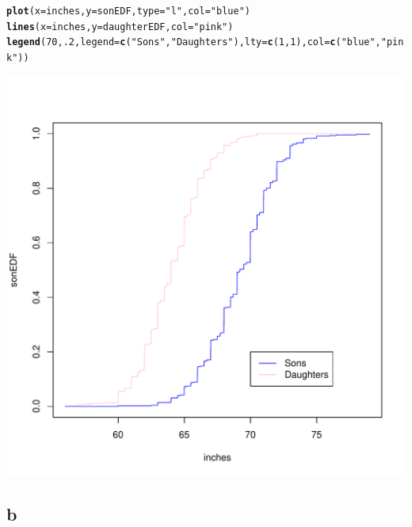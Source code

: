 \documentclass[10pt]{paper}\usepackage[]{graphicx}\usepackage[]{color}
\makeatletter
\def\maxwidth{ %
  \ifdim\Gin@nat@width>\linewidth
    \linewidth
  \else
    \Gin@nat@width
  \fi
}
\newcommand{\hlnum}[1]{\textcolor[rgb]{0.686,0.059,0.569}{#1}}%
\newcommand{\hlstr}[1]{\textcolor[rgb]{0.192,0.494,0.8}{#1}}%
\newcommand{\hlstd}[1]{\textcolor[rgb]{0.345,0.345,0.345}{#1}}%
\newcommand{\hlkwc}[1]{\textcolor[rgb]{0.333,0.667,0.333}{#1}}%
\newcommand{\hlkwd}[1]{\textcolor[rgb]{0.737,0.353,0.396}{\textbf{#1}}}%
\newenvironment{kframe}{%
 \def\at@end@of@kframe{}%
 \ifinner\ifhmode%
  \def\at@end@of@kframe{\end{minipage}}%
  \begin{minipage}{\columnwidth}%
 \fi\fi%
 \def\FrameCommand##1{\hskip\@totalleftmargin \hskip-\fboxsep
 \colorbox{shadecolor}{##1}\hskip-\fboxsep
     \hskip-\linewidth \hskip-\@totalleftmargin \hskip\columnwidth}%
 \MakeFramed {\advance\hsize-\width
   \@totalleftmargin\z@ \linewidth\hsize
   \@setminipage}}%
 {\par\unskip\endMakeFramed%
 \at@end@of@kframe}
\newenvironment{knitrout}{}{} %
\makeatother
\begin{document}
\begin{knitrout}
\begin{kframe}
\begin{alltt}
\hlkwd{plot}\hlstd{(} \hlkwc{x}\hlstd{=inches,} \hlkwc{y}\hlstd{=sonEDF,} \hlkwc{type}\hlstd{=}\hlstr{"l"}\hlstd{,} \hlkwc{col}\hlstd{=}\hlstr{"blue"} \hlstd{)}
\hlkwd{lines}\hlstd{(} \hlkwc{x}\hlstd{=inches,}\hlkwc{y}\hlstd{=daughterEDF,} \hlkwc{col}\hlstd{=}\hlstr{"pink"}\hlstd{)}
\hlkwd{legend}\hlstd{(} \hlnum{70}\hlstd{,}\hlnum{.2}\hlstd{,} \hlkwc{legend}\hlstd{=}\hlkwd{c}\hlstd{(}\hlstr{"Sons"}\hlstd{,}\hlstr{"Daughters"}\hlstd{),} \hlkwc{lty} \hlstd{=} \hlkwd{c}\hlstd{(}\hlnum{1}\hlstd{,}\hlnum{1}\hlstd{) ,} \hlkwc{col}\hlstd{=}\hlkwd{c}\hlstd{(}\hlstr{"blue"}\hlstd{,}\hlstr{"pink"}\hlstd{))}
\end{alltt}
\end{kframe}
\includegraphics[width=\maxwidth]{figure/TwoA-1} 

\end{knitrout}

\subsection*{b}
\end{document}
